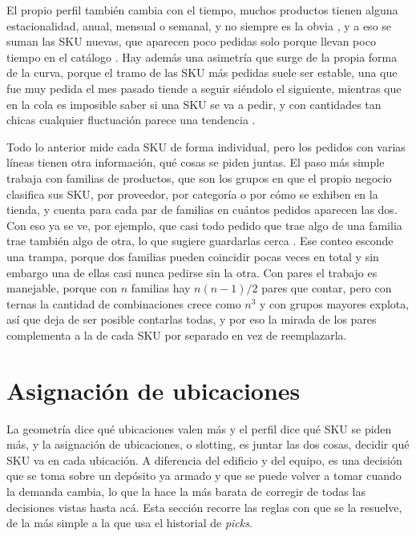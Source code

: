 El propio perfil también cambia con el tiempo, muchos productos tienen alguna estacionalidad, anual, mensual o semanal, y no siempre es la obvia \citep[sección~14.2]{bartholdi2014warehouse}, y a eso se suman las SKU nuevas, que aparecen poco pedidas solo porque llevan poco tiempo en el catálogo \citep[sección~14.1]{bartholdi2014warehouse}.
Hay además una asimetría que surge de la propia forma de la curva, porque el tramo de las SKU más pedidas suele ser estable, una que fue muy pedida el mes pasado tiende a seguir siéndolo el siguiente, mientras que en la cola es imposible saber si una SKU se va a pedir, y con cantidades tan chicas cualquier fluctuación parece una tendencia \citep[sección~2.3]{bartholdi2014warehouse}.

Todo lo anterior mide cada SKU de forma individual, pero los pedidos con varias líneas tienen otra información, qué cosas se piden juntas.
El paso más simple trabaja con familias de productos, que son los grupos en que el propio negocio clasifica sus SKU, por proveedor, por categoría o por cómo se exhiben en la tienda, y cuenta para cada par de familias en cuántos pedidos aparecen las dos.
Con eso ya se ve, por ejemplo, que casi todo pedido que trae algo de una familia trae también algo de otra, lo que sugiere guardarlas cerca \citep[capítulo~14]{bartholdi2014warehouse}.
Ese conteo esconde una trampa, porque dos familias pueden coincidir pocas veces en total y sin embargo una de ellas casi nunca pedirse sin la otra.
Con pares el trabajo es manejable, porque con $n$ familias hay $n(n-1)/2$ pares que contar, pero con ternas la cantidad de combinaciones crece como $n^3$ y con grupos mayores explota, así que deja de ser posible contarlas todas, y por eso la mirada de los pares complementa a la de cada SKU por separado en vez de reemplazarla.

\section{Asignación de ubicaciones}
\label{sec:slotting}

La geometría dice qué ubicaciones valen más y el perfil dice qué SKU se piden más, y la asignación de ubicaciones, o slotting, es juntar las dos cosas, decidir qué SKU va en cada ubicación.
A diferencia del edificio y del equipo, es una decisión que se toma sobre un depósito ya armado y que se puede volver a tomar cuando la demanda cambia, lo que la hace la más barata de corregir de todas las decisiones vistas hasta acá.
Esta sección recorre las reglas con que se la resuelve, de la más simple a la que usa el historial de \emph{picks}.

